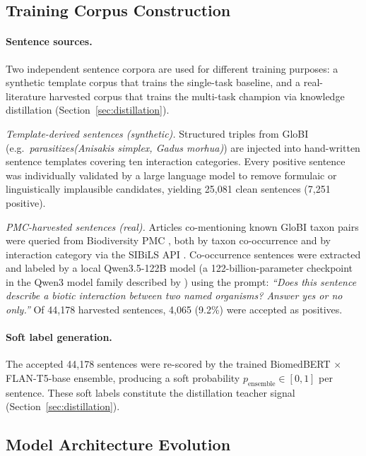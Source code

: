 \documentclass[a4paper,fleqn]{cas-sc}
\begin{document}
\subsection{Training Corpus Construction}
\label{sec:data}

\paragraph{Sentence sources.}
Two independent sentence corpora are used for different training
purposes: a synthetic template corpus that trains the single-task
baseline, and a real-literature harvested corpus that trains the
multi-task champion via knowledge distillation (Section~\ref{sec:distillation}).

\emph{Template-derived sentences (synthetic).}
Structured triples from GloBI (e.g.\ \textit{parasitizes(Anisakis simplex,
Gadus morhua)}) are injected into hand-written sentence templates covering
ten interaction categories. Every positive sentence was individually
validated by a large language model to remove formulaic or linguistically
implausible candidates, yielding 25,081 clean sentences (7,251 positive).

\emph{PMC-harvested sentences (real).}
Articles co-mentioning known GloBI taxon pairs were queried from
Biodiversity PMC \citep{biodiversitypmc2024}, both by taxon co-occurrence
and by interaction category via the SIBiLS API \citep{mottin2021sibils}.
Co-occurrence sentences were extracted and labeled by a local Qwen3.5-122B
model (a 122-billion-parameter checkpoint in the Qwen3 model family
described by \citep{qwen2025technical})
using the prompt:
\textit{``Does this sentence describe a biotic interaction between two named
organisms? Answer yes or no only.''}
Of 44,178 harvested sentences, 4,065 (9.2\%) were accepted as positives.

\paragraph{Soft label generation.}
The accepted 44,178 sentences were re-scored by the trained BiomedBERT
$\times$ FLAN-T5-base ensemble, producing a soft probability
$p_\text{ensemble} \in [0,1]$ per sentence. These soft labels constitute
the distillation teacher signal (Section~\ref{sec:distillation}).

\subsection{Model Architecture Evolution}
\label{sec:architectures}
\end{document}
